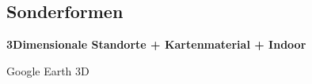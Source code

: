\subsection{Sonderformen}
\textbf{3Dimensionale Standorte + Kartenmaterial + Indoor}

Google Earth 3D 
